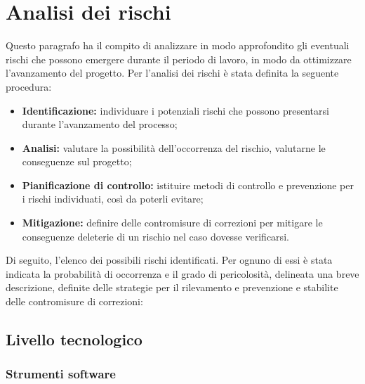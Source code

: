
\section{Analisi dei rischi}
Questo paragrafo ha il compito di analizzare in modo approfondito gli eventuali rischi che possono emergere durante il periodo di lavoro, in modo da ottimizzare l'avanzamento del progetto. Per l'analisi dei rischi è stata definita la seguente procedura:

\begin{itemize}
\item \textbf{Identificazione:} individuare i potenziali rischi che possono presentarsi durante l'avanzamento del processo;
\item \textbf{Analisi:} valutare la possibilità dell'occorrenza del rischio, valutarne le conseguenze sul progetto;
\item \textbf{Pianificazione di controllo:} istituire metodi di controllo e prevenzione per i rischi individuati, così da poterli evitare;
\item \textbf{Mitigazione:} definire delle contromisure di correzioni per mitigare le conseguenze deleterie di un rischio nel caso dovesse verificarsi. 
\end{itemize}

Di seguito, l'elenco dei possibili rischi identificati. Per ognuno di essi è stata indicata la probabilità di occorrenza e il grado di pericolosità, delineata una breve descrizione, definite delle strategie per il rilevamento e prevenzione e stabilite delle contromisure di correzioni: 

\subsection{Livello tecnologico}

\hypertarget{subsubsect:software}{}
\subsubsection{Strumenti software}

